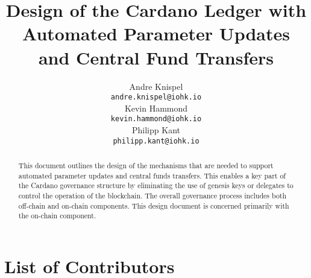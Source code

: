 

\cleardoublepage
\renewcommand{\thepage}{\arabic{page}}
\setcounter{page}{1}

\title{Design of the Cardano Ledger with Automated Parameter Updates and Central Fund Transfers}

\author{
   Andre Knispel \\ {\small \texttt{andre.knispel@iohk.io}} \\
   Kevin Hammond \\ {\small \texttt{kevin.hammond@iohk.io}} \\
   Philipp Kant \\ {\small \texttt{philipp.kant@iohk.io}} \\
   }

\date{}

\maketitle

\begin{abstract}
  This document outlines the design of the mechanisms that are needed to support
  automated parameter updates and central funds transfers.  This enables a key part of the Cardano governance structure by
  eliminating the use of genesis keys or delegates to control the operation of the blockchain.  The overall governance process includes both
  off-chain and on-chain components.  This design document is concerned primarily with the on-chain component.
\end{abstract}

\section*{List of Contributors}
\label{acknowledgements}

